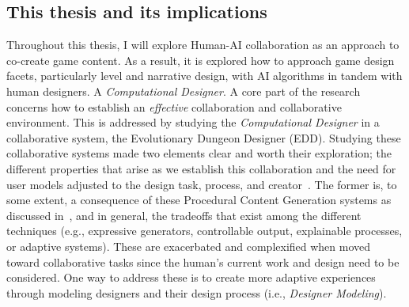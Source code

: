 
\subsection*{This thesis and its implications}



Throughout this thesis, I will explore Human-AI collaboration as an approach to co-create game content. As a result, it is explored how to approach game design facets, particularly level and narrative design, with AI algorithms in tandem with human designers. A \emph{Computational Designer}. A core part of the research concerns how to establish an \emph{effective} collaboration and collaborative environment. This is addressed by studying the \emph{Computational Designer} in a collaborative system, the Evolutionary Dungeon Designer (EDD). Studying these collaborative systems made two elements clear and worth their exploration; the different properties that arise as we establish this collaboration and the need for user models adjusted to the design task, process, and creator~\cite{liapis_designer_2013}. The former is, to some extent, a consequence of these Procedural Content Generation systems as discussed in~\cite{shaker_procedural_2016}, and in general, the tradeoffs that exist among the different techniques (e.g., expressive generators, controllable output, explainable processes, or adaptive systems). These are exacerbated and complexified when moved toward collaborative tasks since the human's current work and design need to be considered. One way to address these is to create more adaptive experiences through modeling designers and their design process (i.e., \emph{Designer Modeling}). 



